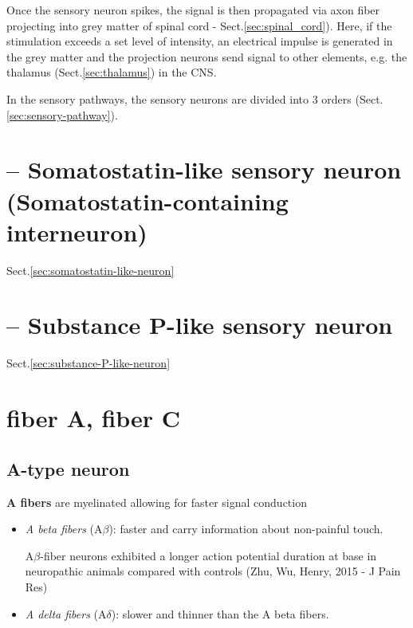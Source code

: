 Once the sensory neuron spikes, the signal is then propagated via axon fiber
projecting into grey matter of spinal cord - Sect.\ref{sec:spinal_cord}).
Here, if the stimulation exceeds a set level of intensity, an electrical impulse
is generated in the grey matter and the projection neurons send signal to
other elements, e.g. the thalamus (Sect.\ref{sec:thalamus}) in the CNS.

In the sensory pathways, the sensory neurons are divided into 3 orders
(Sect.\ref{sec:sensory-pathway}).


\section{-- Somatostatin-like sensory neuron (Somatostatin-containing
interneuron)}
\label{sec:somatostatin-containing-interneuron}

Sect.\ref{sec:somatostatin-like-neuron}


\section{-- Substance P-like sensory neuron}
\label{sec:substance-P-like-sensory-neuron}

Sect.\ref{sec:substance-P-like-neuron}


\section{fiber A, fiber C}
\label{sec:A-fiber}
\label{sec:C-fiber}

\subsection{A-type neuron}
\label{sec:A-type-sensory-neuron}

{\bf A fibers} are myelinated allowing for faster signal conduction
\begin{itemize}
  \item {\it A beta fibers} (A$\beta$):  faster and carry information about
  non-painful touch.

A$\beta$-fiber neurons exhibited a longer action potential duration at base in
neuropathic animals compared with controls (Zhu, Wu, Henry, 2015 - J Pain Res)


  \item {\it A delta fibers} (A$\delta$): slower and thinner than the A beta
  fibers.
\end{itemize}

